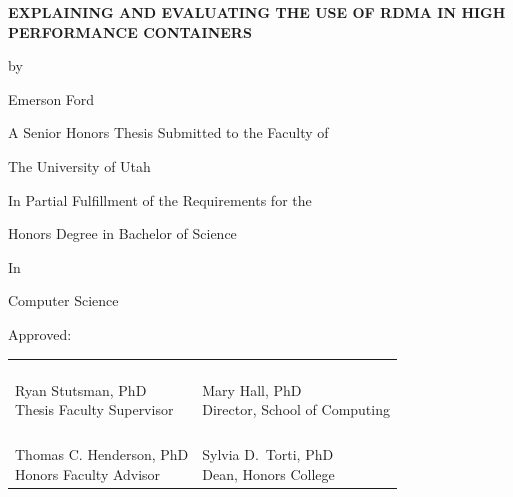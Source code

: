 \documentclass[12pt,titlepage]{article}
\begin{document}
{}
\begin{titlingpage}
	\begin{center}
	\uppercase{\textbf{Explaining and Evaluating the Use of RDMA in High Performance Containers}}\vspace{2em}

	by

	Emerson Ford\vspace{2em}

	A Senior Honors Thesis Submitted to the Faculty of\vspace{-1em}

	The University of Utah\vspace{-1em}

	In Partial Fulfillment of the Requirements for the

	Honors Degree in Bachelor of Science\vspace{2em}

	In

	Computer Science
	\end{center}

	\noindent
	Approved:
	\vspace{2em}
	\begin{center}
		\begin{tabularx}{\textwidth} {@{}X X@{}}
			\nomakegapedcells{}
			\makecell[lp{{\hsize-2em}}]{\hrulefill{}\vspace{-1em}\newline{}Ryan Stutsman, PhD\vspace{-1em}\newline{}Thesis Faculty Supervisor} & \makecell[lp{{\hsize-2em}}]{\hrulefill{}\vspace{-1em}\newline{}Mary Hall, PhD\vspace{-1em}\newline{}Director, School of Computing} \\[5em]
			\makecell[lp{{\hsize-2em}}]{\hrulefill{}\vspace{-1em}\newline{}Thomas C. Henderson, PhD\vspace{-1em}\newline{}Honors Faculty Advisor} & \makecell[lp{{\hsize-2em}}]{\hrulefill{}\vspace{-1em}\newline{}Sylvia D.\ Torti, PhD\vspace{-1em}\newline{}Dean, Honors College}


\end{tabularx}
\end{center}
\end{titlingpage}
\end{document}
